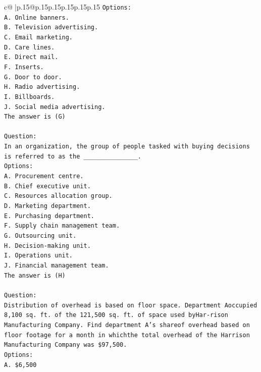 \documentclass{article}
\begin{document}
{\begin{supertabular}{c@{$\;$}|p{.15\linewidth}@{}p{.15\linewidth}p{.15\linewidth}p{.15\linewidth}p{.15\linewidth}p{.15\linewidth}}
{{{\texttt{Options:} \\
\texttt{A. Online banners.} \\
\texttt{B. Television advertising.} \\
\texttt{C. Email marketing.} \\
\texttt{D. Care lines.} \\
\texttt{E. Direct mail.} \\
\texttt{F. Inserts.} \\
\texttt{G. Door to door.} \\
\texttt{H. Radio advertising.} \\
\texttt{I. Billboards.} \\
\texttt{J. Social media advertising.} \\
\texttt{The answer is (G)} \\
\\ 
\texttt{Question:} \\
\texttt{In an organization, the group of people tasked with buying decisions is referred to as the \_\_\_\_\_\_\_\_\_\_\_\_\_\_\_.} \\
\texttt{Options:} \\
\texttt{A. Procurement centre.} \\
\texttt{B. Chief executive unit.} \\
\texttt{C. Resources allocation group.} \\
\texttt{D. Marketing department.} \\
\texttt{E. Purchasing department.} \\
\texttt{F. Supply chain management team.} \\
\texttt{G. Outsourcing unit.} \\
\texttt{H. Decision{-}making unit.} \\
\texttt{I. Operations unit.} \\
\texttt{J. Financial management team.} \\
\texttt{The answer is (H)} \\
\\ 
\texttt{Question:} \\
\texttt{Distribution of overhead is based on floor space. Department Aoccupied 8,100 sq. ft. of the 121,500 sq. ft. of space used byHar{-}rison Manufacturing Company. Find department A's shareof overhead based on floor footage for a month in whichthe total overhead of the Harrison Manufacturing Company was \$97,500.} \\
\texttt{Options:} \\
\texttt{A. \$6,500} \\
}}}
\end{supertabular}}
\end{document}
